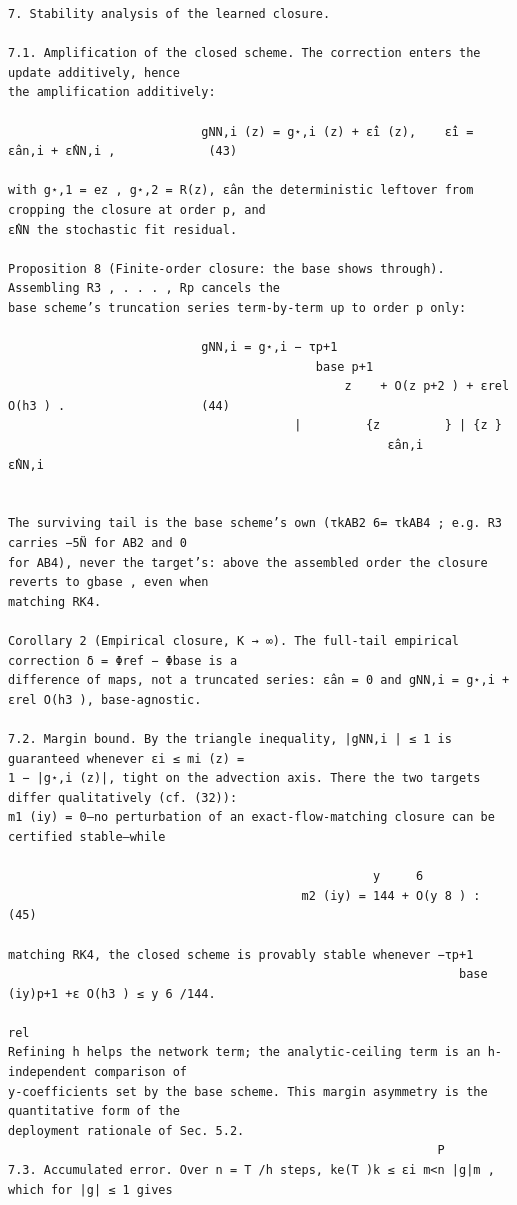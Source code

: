 \documentclass[letterpaper]{article}
\begin{document}
\begin{Verbatim}[fontsize=\fontsize{6.35}{7.15}\selectfont,breaklines=false]
7. Stability analysis of the learned closure.

7.1. Amplification of the closed scheme. The correction enters the update additively, hence
the amplification additively:

                           gNN,i (z) = g⋆,i (z) + ε̂i (z),    ε̂i = ε̂an,i + ε̂NN,i ,             (43)

with g⋆,1 = ez , g⋆,2 = R(z), ε̂an the deterministic leftover from cropping the closure at order p, and
ε̂NN the stochastic fit residual.

Proposition 8 (Finite-order closure: the base shows through). Assembling R3 , . . . , Rp cancels the
base scheme’s truncation series term-by-term up to order p only:

                           gNN,i = g⋆,i − τp+1
                                           base p+1
                                               z    + O(z p+2 ) + εrel O(h3 ) .                   (44)
                                        |         {z         } | {z }
                                                     ε̂an,i               ε̂NN,i


The surviving tail is the base scheme’s own (τkAB2 6= τkAB4 ; e.g. R3 carries −5N̈ for AB2 and 0
for AB4), never the target’s: above the assembled order the closure reverts to gbase , even when
matching RK4.

Corollary 2 (Empirical closure, K → ∞). The full-tail empirical correction δ = Φref − Φbase is a
difference of maps, not a truncated series: ε̂an = 0 and gNN,i = g⋆,i + εrel O(h3 ), base-agnostic.

7.2. Margin bound. By the triangle inequality, |gNN,i | ≤ 1 is guaranteed whenever εi ≤ mi (z) =
1 − |g⋆,i (z)|, tight on the advection axis. There the two targets differ qualitatively (cf. (32)):
m1 (iy) = 0—no perturbation of an exact-flow-matching closure can be certified stable—while

                                                   y     6
                                         m2 (iy) = 144 + O(y 8 ) :                                (45)

matching RK4, the closed scheme is provably stable whenever −τp+1
                                                               base (iy)p+1 +ε O(h3 ) ≤ y 6 /144.
                                                                              rel
Refining h helps the network term; the analytic-ceiling term is an h-independent comparison of
y-coefficients set by the base scheme. This margin asymmetry is the quantitative form of the
deployment rationale of Sec. 5.2.
                                                            P
7.3. Accumulated error. Over n = T /h steps, ke(T )k ≤ εi m<n |g|m , which for |g| ≤ 1 gives


\end{Verbatim}
\end{document}
